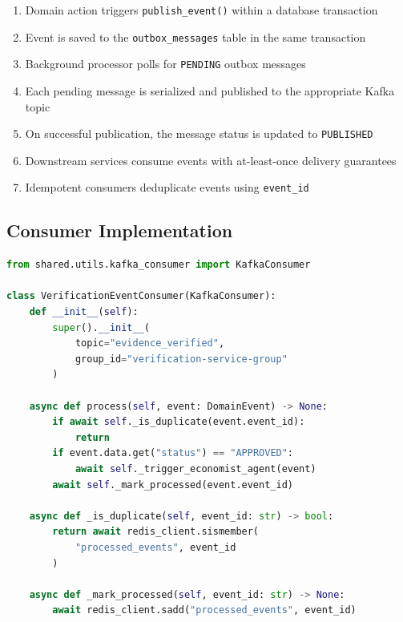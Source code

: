 \documentclass[11pt,a4paper]{article}
\begin{document}
\begin{enumerate}
  \item Domain action triggers \texttt{publish\_event()} within a database transaction
  \item Event is saved to the \texttt{outbox\_messages} table in the same transaction
  \item Background processor polls for \texttt{PENDING} outbox messages
  \item Each pending message is serialized and published to the appropriate Kafka topic
  \item On successful publication, the message status is updated to \texttt{PUBLISHED}
  \item Downstream services consume events with at-least-once delivery guarantees
  \item Idempotent consumers deduplicate events using \texttt{event\_id}
\end{enumerate}

\subsection{Consumer Implementation}

\begin{lstlisting}[language=Python, caption=Idempotent Kafka Consumer]
from shared.utils.kafka_consumer import KafkaConsumer

class VerificationEventConsumer(KafkaConsumer):
    def __init__(self):
        super().__init__(
            topic="evidence_verified",
            group_id="verification-service-group"
        )

    async def process(self, event: DomainEvent) -> None:
        if await self._is_duplicate(event.event_id):
            return
        if event.data.get("status") == "APPROVED":
            await self._trigger_economist_agent(event)
        await self._mark_processed(event.event_id)

    async def _is_duplicate(self, event_id: str) -> bool:
        return await redis_client.sismember(
            "processed_events", event_id
        )

    async def _mark_processed(self, event_id: str) -> None:
        await redis_client.sadd("processed_events", event_id)
\end{lstlisting}

\clearpage

\end{document}
